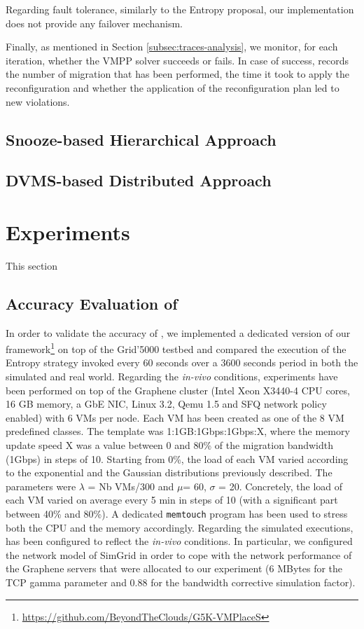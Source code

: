 Regarding fault tolerance, similarly to the Entropy proposal, our
implementation does not provide any failover mechanism.

Finally, as mentioned in Section \ref{subsec:traces-analysis}, we monitor, for each iteration,
whether the VMPP solver succeeds or fails. In case of success, \vmps
records the number of migration that has been performed, the time it
took to apply the reconfiguration and whether
the application of the reconfiguration plan led to new violations.

\subsection{Snooze-based Hierarchical Approach}
\label{subsec:snooze}


\subsection{DVMS-based Distributed Approach}
\label{subsec:dvms}


\section{Experiments}
\label{sec:experiments}
This section

\subsection{Accuracy Evaluation of \vmps}
In order to validate the accuracy of \vmps, we implemented a dedicated
version of our
framework\footnote{\url{https://github.com/BeyondTheClouds/G5K-VMPlaceS}}
on top of the Grid'5000 testbed and compared the execution of the
Entropy strategy invoked every 60 seconds over a 3600 seconds period
in both the simulated and real world. Regarding the \textit{in-vivo}
conditions, experiments have been performed on top of the Graphene
cluster (Intel Xeon X3440-4 CPU cores, 16 GB memory, a GbE NIC, Linux
3.2, Qemu 1.5 and SFQ network policy enabled) with 6 VMs per node.
Each VM has been created as one of the 8 VM predefined classes. The
template was 1:1GB:1Gbps:1Gbps:X, where the memory update speed X was
a value between 0 and 80\% of the migration bandwidth (1Gbps) in steps
of 10. Starting from 0\%, the load of each VM varied according to the
exponential and the Gaussian distributions previously described. The
parameters were $\lambda$ = Nb VMs/300 and $\mu$= 60, $\sigma$ = 20.
Concretely, the load of each VM varied on average every 5 min in steps
of 10 (with a significant part between 40\% and 80\%). A dedicated
\texttt{memtouch} program\cite{Hirofuchi:2013:ALM:2568486.2568524} has
been used to stress both the CPU and the memory accordingly. Regarding
the simulated executions, \vmps has been configured to reflect the
\textit{in-vivo} conditions. In particular, we configured the network model of
SimGrid in order to cope with the network performance of the Graphene
servers that were allocated to our experiment (6 MBytes for the TCP
gamma parameter and 0.88 for the bandwidth corrective simulation
factor).

